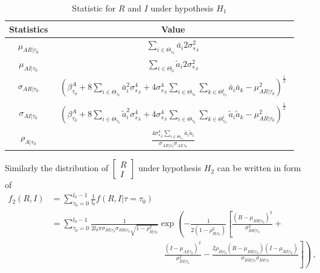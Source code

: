 \begin{table}[h]
\centering
  \begin{tabular}{|c|c|}
	\hline
	Statistics          & Value                                                                                                                                                                                                                 \\ \hline
	$\mu_{AR|\tau_0}$    & $\displaystyle{\sum_{i\in\Theta_{\tau_0}}\bar{a}_i2\sigma_{s_A}^2}$                                                                                                                                                                      \\ \hline
	$\mu_{AI|\tau_0}$    & $\displaystyle{\sum_{i\in\Theta_0}\tilde{a}_i2\sigma_{s_A}^2}$                                                                                                                                                                           \\ \hline
    $\sigma_{AR|\tau_0}$ & $\displaystyle{\left(\beta_{\tau_0}^A+8\sum_{i\in\Theta_{\tau_0}}\bar{a}_i^2\sigma_{s_A}^4 + 4\sigma_{s_A}^4\sum_{i\in\Theta_{\tau_0}}\sum_{k\in\Theta_{\tau_0}^i}\bar{a}_i\bar{a}_k- \mu_{AR|\tau_0}^2 \right)^\frac{1}{2}}$  \\ \hline
    $\sigma_{AI|\tau_0}$ & 
    $\begin{array} {l} \displaystyle{\left(\beta_{\tau_0}^A +8\sum_{i\in\Theta_{\tau_0}}\tilde{a}_i^2\sigma_{s_A}^4 +4\sigma_{s_A}^4\sum_{i\in\Theta_{\tau_0}}\sum_{k\in\Theta_{\tau_0}^i}\tilde{a}_i\tilde{a}_k- \mu_{AR|\tau_0}^2\right)^\frac{1}{2}}\end{array}$ 
    \\ \hline
	$\rho_{A|\tau_0}$    & $ \displaystyle{\frac{4\sigma_{s_A}^4\sum_{i\in\Theta_{\tau_0}}\bar{a}_i\tilde{a}_i}{\sigma_{AR|\tau_0}\sigma_{AI|\tau_0}}}$                                                                            \\ \hline
  \end{tabular}
  \caption{Statistic for $R$ and $I$ under hypothesis $H_1$}
  \label{Table2}
\end{table}
Similarly the distribution of  
$\begin{bmatrix}
  R \\
  I
\end{bmatrix}$
under hypothesis $H_2$ can be written in form of 
\begin{equation}
  \begin{split}
	f_2(R, I) &= \sum_{\tau_0 = 0}^{l_0-1} \frac{1}{l_0}f(R, I|\tau=\tau_0)\\
	&= \sum_{\tau_0 = 0}^{l_0-1}\frac{1}{2l_0\pi\sigma_{BI|\tau_0}\sigma_{BR|\tau_0}\sqrt{1 - \rho_{B|\tau_0}^2}}\exp\left( -\frac{1}{2(1-\rho_{B|\tau_0}^2)}\left[ \frac{(R-\mu_{BR|\tau_0})^2}{\sigma_{BR|\tau_0}^2} + \right.\right.\\
	& \left. \left. \;\;\;\;\;\;\;\;\;\;\;\;\;\;\;\; \;\;\;\;\;\;\;\;\;\;\;\;\;\;\;\; \;\;\;\;\;\;\;\;\;\;\;\;\;\;\;\; \frac{(I-\mu_{AI|\tau_0})^2}{\sigma_{BI|\tau_0}^2} - \frac{2\rho_{B|\tau_0}(R-\mu_{BR|\tau_0})(I-\mu_{BI|\tau_0})}{\sigma_{BR|\tau_0}\sigma_{BI|\tau_0}}\right] \right)\,,
  \end{split}
  \label{f_2underH2}
\end{equation}
